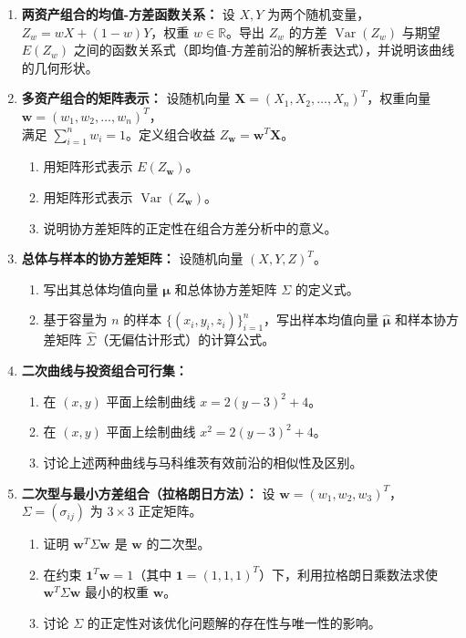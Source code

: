 \documentclass{article}
\begin{document}
\begin{enumerate}
\item \textbf{两资产组合的均值-方差函数关系：}
设 $X,Y$ 为两个随机变量，$Z_w = wX + (1-w)Y$，权重 $w \in \mathbb{R}$。导出 $Z_w$ 的方差 $\operatorname{Var}(Z_w)$ 与期望 $E(Z_w)$ 之间的函数关系式（即均值-方差前沿的解析表达式），并说明该曲线的几何形状。

\item \textbf{多资产组合的矩阵表示：}
设随机向量 $\mathbf{X} = (X_1, X_2, \dots, X_n)^T$，权重向量 $\mathbf{w} = (w_1, w_2, \dots, w_n)^T$，\\ 满足 $\sum_{i=1}^n w_i = 1$。定义组合收益 $Z_{\mathbf{w}} = \mathbf{w}^T \mathbf{X}$。
\begin{enumerate}
\item 用矩阵形式表示 $E(Z_{\mathbf{w}})$。
\item 用矩阵形式表示 $\operatorname{Var}(Z_{\mathbf{w}})$。
\item 说明协方差矩阵的正定性在组合方差分析中的意义。
\end{enumerate}

\item \textbf{总体与样本的协方差矩阵：}
设随机向量 $(X,Y,Z)^T$。
\begin{enumerate}
\item 写出其总体均值向量 $\boldsymbol{\mu}$ 和总体协方差矩阵 $\Sigma$ 的定义式。
\item 基于容量为 $n$ 的样本 $\{(x_i, y_i, z_i)\}_{i=1}^n$，写出样本均值向量 $\hat{\boldsymbol{\mu}}$ 和样本协方差矩阵 $\hat{\Sigma}$（无偏估计形式）的计算公式。
\end{enumerate}

\item \textbf{二次曲线与投资组合可行集：}
\begin{enumerate}
\item 在 $(x,y)$ 平面上绘制曲线 $x = 2(y-3)^2 + 4$。
\item 在 $(x,y)$ 平面上绘制曲线 $x^2 = 2(y-3)^2 + 4$。
\item 讨论上述两种曲线与马科维茨有效前沿的相似性及区别。
\end{enumerate}

\item \textbf{二次型与最小方差组合（拉格朗日方法）：}
设 $\mathbf{w} = (w_1, w_2, w_3)^T$，$\Sigma = (\sigma_{ij})$ 为 $3\times 3$ 正定矩阵。
\begin{enumerate}
\item 证明 $\mathbf{w}^T \Sigma \mathbf{w}$ 是 $\mathbf{w}$ 的二次型。
\item 在约束 $\mathbf{1}^T \mathbf{w} = 1$（其中 $\mathbf{1} = (1,1,1)^T$）下，利用拉格朗日乘数法求使 $\mathbf{w}^T \Sigma \mathbf{w}$ 最小的权重 $\mathbf{w}$。
\item 讨论 $\Sigma$ 的正定性对该优化问题解的存在性与唯一性的影响。
\end{enumerate}


\end{enumerate}
\end{document}
